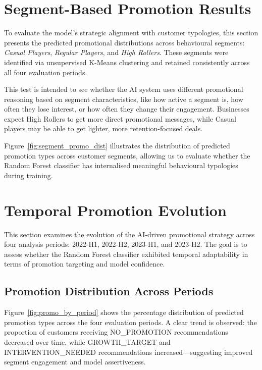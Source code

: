 \documentclass[12pt,a4paper]{report}
\begin{document}

\section{Segment-Based Promotion Results} 
\label{sec:segment_promotion_results}

To evaluate the model’s strategic alignment with customer typologies, this section presents the predicted promotional distributions across behavioural segments: \textit{Casual Players}, \textit{Regular Players}, and \textit{High Rollers}. These segments were identified via unsupervised K-Means clustering and retained consistently across all four evaluation periods.

This test is intended to see whether the AI system uses different promotional reasoning based on segment characteristics, like how active a segment is, how often they lose interest, or how often they change their engagement. Businesses expect High Rollers to get more direct promotional messages, while Casual players may be able to get lighter, more retention-focused deals.

Figure~\ref{fig:segment_promo_dist} illustrates the distribution of predicted promotion types across customer segments, allowing us to evaluate whether the Random Forest classifier has internalised meaningful behavioural typologies during training.


\section{Temporal Promotion Evolution}
\label{sec:temporal_promo_evolution}

This section examines the evolution of the AI-driven promotional strategy across four analysis periods: 2022-H1, 2022-H2, 2023-H1, and 2023-H2. The goal is to assess whether the Random Forest classifier exhibited temporal adaptability in terms of promotion targeting and model confidence.

\subsection*{Promotion Distribution Across Periods}
Figure~\ref{fig:promo_by_period} shows the percentage distribution of predicted promotion types across the four evaluation periods. A clear trend is observed: the proportion of customers receiving NO\_PROMOTION recommendations decreased over time, while GROWTH\_TARGET and INTERVENTION\_NEEDED recommendations increased—suggesting improved segment engagement and model assertiveness.
\end{document}
